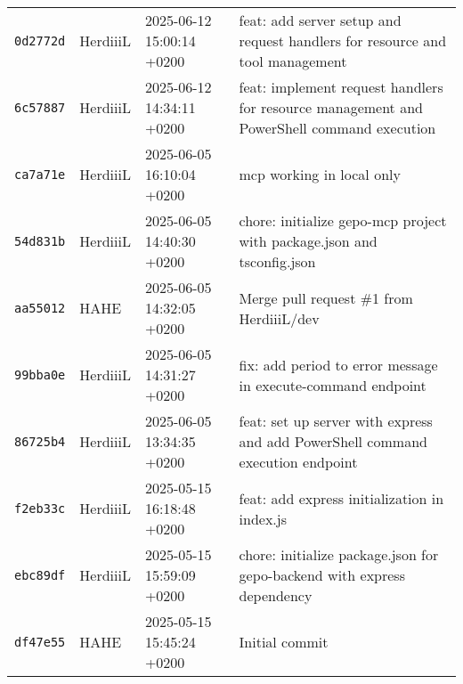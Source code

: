 \begin{longtable}{@{}p{2.5cm}p{3.5cm}p{3.5cm}p{7cm}@{}}
\texttt{0d2772d} & HerdiiiL & 2025-06-12 15:00:14 +0200 & feat: add server setup and request handlers for resource and tool management \\
\texttt{6c57887} & HerdiiiL & 2025-06-12 14:34:11 +0200 & feat: implement request handlers for resource management and PowerShell command execution \\
\texttt{ca7a71e} & HerdiiiL & 2025-06-05 16:10:04 +0200 & mcp working in local only \\
\texttt{54d831b} & HerdiiiL & 2025-06-05 14:40:30 +0200 & chore: initialize gepo-mcp project with package.json and tsconfig.json \\
\texttt{aa55012} & HAHE & 2025-06-05 14:32:05 +0200 & Merge pull request \#1 from HerdiiiL/dev \\
\texttt{99bba0e} & HerdiiiL & 2025-06-05 14:31:27 +0200 & fix: add period to error message in execute-command endpoint \\
\texttt{86725b4} & HerdiiiL & 2025-06-05 13:34:35 +0200 & feat: set up server with express and add PowerShell command execution endpoint \\
\texttt{f2eb33c} & HerdiiiL & 2025-05-15 16:18:48 +0200 & feat: add express initialization in index.js \\
\texttt{ebc89df} & HerdiiiL & 2025-05-15 15:59:09 +0200 & chore: initialize package.json for gepo-backend with express dependency \\
\texttt{df47e55} & HAHE & 2025-05-15 15:45:24 +0200 & Initial commit \\
\bottomrule
\end{longtable}
